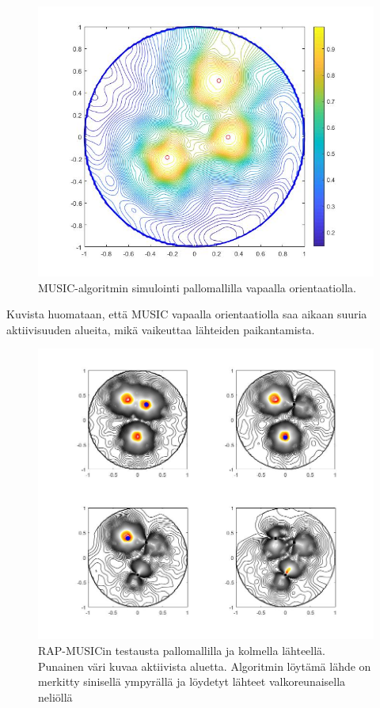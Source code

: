 \begin{figure}[h]
    \centering
    \includegraphics[scale=0.4]{mfree.jpg}
    \caption{MUSIC-algoritmin simulointi pallomallilla vapaalla orientaatiolla.}
    \label{fig:mfree}
\end{figure}

Kuvista huomataan, että MUSIC vapaalla orientaatiolla saa aikaan suuria aktiivisuuden alueita, mikä vaikeuttaa lähteiden paikantamista.

\begin{figure}[h]
    \centering
    \includegraphics[width=1\textwidth]{rap11.jpg}
    \caption{RAP-MUSICin testausta pallomallilla ja kolmella lähteellä. Punainen väri kuvaa aktiivista aluetta. Algoritmin löytämä lähde on merkitty sinisellä ympyrällä ja löydetyt lähteet valkoreunaisella neliöllä}
    \label{fig:RAP}
\end{figure}

